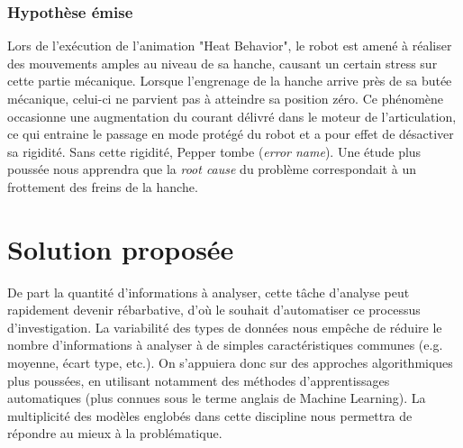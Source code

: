 \subsubsection{Hypothèse émise}
 Lors de l'exécution de l'animation "Heat Behavior", le robot est amené à réaliser des mouvements amples au niveau de sa hanche, causant un certain stress sur cette partie mécanique. Lorsque l'engrenage de la hanche arrive près de sa butée mécanique, celui-ci ne parvient pas à atteindre sa position zéro. Ce phénomène occasionne une augmentation du courant délivré dans le moteur de l'articulation, ce qui entraine le passage en mode protégé du robot et a pour effet de désactiver sa rigidité. Sans cette rigidité, Pepper tombe (\emph{error name}). Une étude plus poussée nous apprendra que la\emph{ root cause } du problème correspondait à un frottement des freins de la hanche. 


\section{Solution proposée}
De part la quantité d'informations à analyser, cette tâche d'analyse peut rapidement devenir rébarbative, d'où le souhait d'automatiser ce processus d'investigation. La variabilité des types de données nous empêche de réduire le nombre d'informations à analyser à de simples caractéristiques communes (e.g. moyenne, écart type, etc.). On s'appuiera donc sur des approches algorithmiques plus poussées, en utilisant notamment des méthodes d'apprentissages automatiques (plus connues sous le terme anglais de Machine Learning). La multiplicité des modèles englobés dans cette discipline nous permettra de répondre au mieux à la problématique.